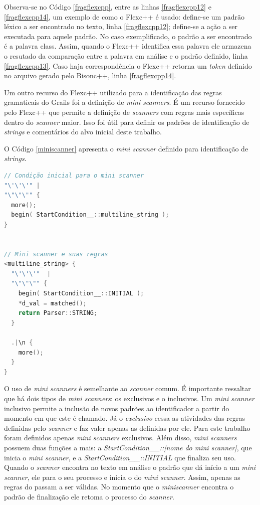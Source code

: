 Observa-se no Código \ref{fragflexcpp}, entre as linhas \ref{fragflexcpp12} e \ref{fragflexcpp14}, um exemplo de como o \textsf{Flexc++} é usado:
define-se um padrão léxico a ser encontrado no texto, linha \ref{fragflexcpp12};
define-se a ação a ser executada para aquele padrão. No caso exemplificado, o
padrão a ser encontrado é a palavra \textsf{class}. Assim, quando o Flexc++
identifica essa palavra ele armazena o resutado da comparação entre a palavra em
análise e o padrão definido, linha \ref{fragflexcpp13}. Caso haja correspondência o
Flexc++ retorna um \textit{token} definido no arquivo gerado pelo
\textsf{Bisonc++}, linha \ref{fragflexcpp14}.

Um outro recurso do \textsf{Flexc++} utilizado para a identificação das regras
gramaticais do \textsf{Grails} foi a definição de \textit{mini scanners}. É um
recurso fornecido pelo \textsf{Flexc++} que permite a definição de \textit{scanners}
com regras mais específicas dentro do \textit{scanner} maior. Isso foi útil para
definir os padrões de identificação de \textit{strings} e comentários do alvo inicial deste trabalho.

O Código \ref{miniscanner} apresenta o \textit{mini scanner} definido para
identificação de \textit{strings}.

\begin{lstlisting}[language=C++, label=miniscanner, caption=Implementação do Mini scanner de Strings]
// Condição inicial para o mini scanner
"\'\'\'" |
"\"\"\"" {
  more();
  begin( StartCondition__::multiline_string );
}


// Mini scanner e suas regras
<multiline_string> {
  "\'\'\'"  |
  "\"\"\"" {
    begin( StartCondition__::INITIAL );
    *d_val = matched();
    return Parser::STRING;
  }

  .|\n {
    more();
  }
}
\end{lstlisting}

O uso de \textit{mini scanners} é semelhante ao \textit{scanner} comum. É
importante ressaltar que há dois tipos de \textit{mini scanners}: os exclusivos
e o inclusivos. Um \textit{mini scanner} inclusivo permite a inclusão de novos
padrões ao identificador a partir do momento em que este é chamado. Já o
\textit{exclusivo} cessa as atividades das regras definidas pelo \textit{scanner}
e faz valer apenas as definidas por ele. Para este trabalho foram definidos apenas
\textit{mini scanners} exclusivos. Além disso, \textit{mini scanners} possuem
duas funções a mais: a \textit{StartCondition\_\_::[nome do mini scanner]}, que
inicia o \textit{mini scanner}, e a \textit{StartCondition\_\_::INITIAL} que
finaliza seu uso. Quando o \textit{scanner} encontra no texto em análise o
padrão que dá início a um \textit{mini scanner}, ele para o seu processo e
inicia o do \textit{mini scanner}. Assim, apenas as regras do \miniscanner passam a ser
válidas. No momento que o \textit{miniscanner} encontra o padrão de finalização
ele retoma o processo do \textit{scanner}.

